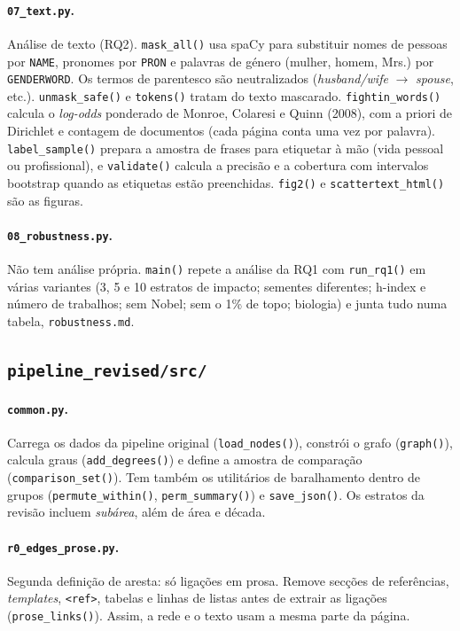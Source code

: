 \documentclass[11pt,a4paper]{article}
\newcommand{\file}[1]{\texttt{#1}}
\newcommand{\fn}[1]{\texttt{#1()}}
\begin{document}
\paragraph{\file{07_text.py}.} Análise de texto (RQ2). \fn{mask_all} usa spaCy para substituir nomes de pessoas por \texttt{NAME}, pronomes por \texttt{PRON} e palavras de género (mulher, homem, Mrs.) por \texttt{GENDERWORD}. Os termos de parentesco são neutralizados (\emph{husband/wife} $\to$ \emph{spouse}, etc.). \fn{unmask_safe} e \fn{tokens} tratam do texto mascarado. \fn{fightin_words} calcula o \emph{log-odds} ponderado de Monroe, Colaresi e Quinn (2008), com a priori de Dirichlet e contagem de documentos (cada página conta uma vez por palavra). \fn{label_sample} prepara a amostra de frases para etiquetar à mão (vida pessoal ou profissional), e \fn{validate} calcula a precisão e a cobertura com intervalos bootstrap quando as etiquetas estão preenchidas. \fn{fig2} e \fn{scattertext_html} são as figuras.

\paragraph{\file{08_robustness.py}.} Não tem análise própria. \fn{main} repete a análise da RQ1 com \fn{run_rq1} em várias variantes (3, 5 e 10 estratos de impacto; sementes diferentes; h-index e número de trabalhos; sem Nobel; sem o 1\% de topo; biologia) e junta tudo numa tabela, \file{robustness.md}.

\subsection{\file{pipeline_revised/src/}}

\paragraph{\file{common.py}.} Carrega os dados da pipeline original (\fn{load_nodes}), constrói o grafo (\fn{graph}), calcula graus (\fn{add_degrees}) e define a amostra de comparação (\fn{comparison_set}). Tem também os utilitários de baralhamento dentro de grupos (\fn{permute_within}, \fn{perm_summary}) e \fn{save_json}. Os estratos da revisão incluem \emph{subárea}, além de área e década.

\paragraph{\file{r0_edges_prose.py}.} Segunda definição de aresta: só ligações em prosa. Remove secções de referências, \emph{templates}, \texttt{<ref>}, tabelas e linhas de listas antes de extrair as ligações (\fn{prose_links}). Assim, a rede e o texto usam a mesma parte da página.
\end{document}
